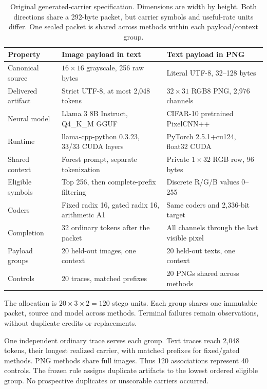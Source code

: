 \begin{table}[t]
\caption{Original generated-carrier specification. Dimensions are width by height. Both directions share a 292-byte packet, but carrier symbols and useful-rate units differ. One sealed packet is shared across methods within each payload/context group.}
\label{tab:specification}\centering\small
\begin{tabularx}{\textwidth}{@{}p{2.8cm}YY@{}}
\toprule
Property & Image payload in text & Text payload in PNG \\
\midrule
Canonical source & $16\times16$ grayscale, 256 raw bytes & Literal UTF-8, 32--128 bytes \\
Delivered artifact & Strict UTF-8, at most 2,048 tokens & $32\times31$ RGB8 PNG, 2,976 channels \\
Neural model & Llama 3 8B Instruct, Q4\_K\_M GGUF & CIFAR-10 pretrained PixelCNN++ \\
Runtime & llama-cpp-python 0.3.23, 33/33 CUDA layers & PyTorch 2.5.1+cu124, float32 CUDA \\
Shared context & Forest prompt, separate tokenization & Private $1\times32$ RGB row, 96 bytes \\
Eligible symbols & Top 256, then complete-prefix filtering & Discrete R/G/B values 0--255 \\
Coders & Fixed radix 16, gated radix 16, arithmetic A1 & Same coders and 2,336-bit target \\
Completion & 32 ordinary tokens after the packet & All channels through the last visible pixel \\
Payload groups & 20 held-out images, one context & 20 held-out texts, one context \\
Controls & 20 traces, matched prefixes & 20 PNGs shared across methods \\
\bottomrule
\end{tabularx}
\end{table}

The allocation is $20\times3\times2=120$ stego units. Each group shares one immutable packet, source and model across methods. Terminal failures remain observations, without duplicate credits or replacements.

One independent ordinary trace serves each group. Text traces reach 2,048 tokens, their longest realized carrier, with matched prefixes for fixed/gated methods. PNG methods share full images. Thus 120 associations represent 40 controls. The frozen rule assigns duplicate artifacts to the lowest ordered eligible group. No prospective duplicates or unscorable carriers occurred.


